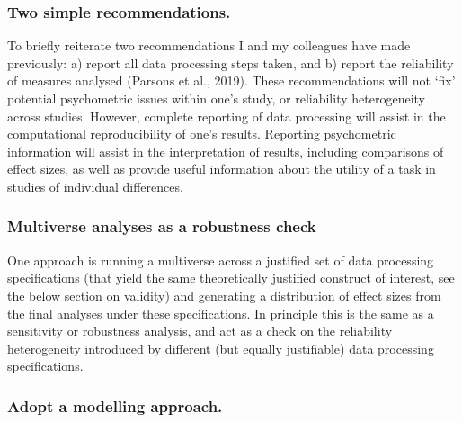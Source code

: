 \documentclass[
  man,floatsintext]{apa6}
\begin{document}
\hypertarget{two-simple-recommendations.}{%
\subsubsection{Two simple recommendations.}\label{two-simple-recommendations.}}

To briefly reiterate two recommendations I and my colleagues have made previously: a) report all data processing steps taken, and b) report the reliability of measures analysed (Parsons et al., 2019). These recommendations will not `fix' potential psychometric issues within one's study, or reliability heterogeneity across studies. However, complete reporting of data processing will assist in the computational reproducibility of one's results. Reporting psychometric information will assist in the interpretation of results, including comparisons of effect sizes, as well as provide useful information about the utility of a task in studies of individual differences.

\hypertarget{multiverse-analyses-as-a-robustness-check}{%
\subsubsection{Multiverse analyses as a robustness check}\label{multiverse-analyses-as-a-robustness-check}}

One approach is running a multiverse across a justified set of data processing specifications (that yield the same theoretically justified construct of interest, see the below section on validity) and generating a distribution of effect sizes from the final analyses under these specifications. In principle this is the same as a sensitivity or robustness analysis, and act as a check on the reliability heterogeneity introduced by different (but equally justifiable) data processing specifications.

\hypertarget{adopt-a-modelling-approach.}{%
\subsubsection{Adopt a modelling approach.}\label{adopt-a-modelling-approach.}}
\end{document}
